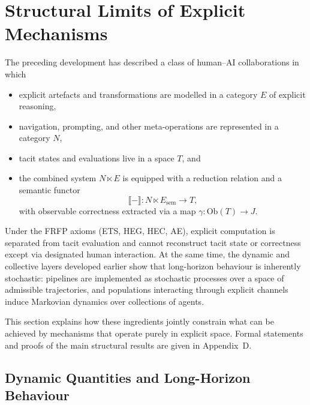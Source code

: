 \section{Structural Limits of Explicit Mechanisms}
\label{sec:structural-limits-explicit}

The preceding development has described a class of human--AI collaborations in which
\begin{itemize}
  \item explicit artefacts and transformations are modelled in a category $E$ of explicit reasoning,
  \item navigation, prompting, and other meta-operations are represented in a category $N$,
  \item tacit states and evaluations live in a space $T$, and
  \item the combined system $N \ltimes E$ is equipped with a reduction relation and a semantic functor
    \[
      \llbracket - \rrbracket : N \ltimes E_{\mathrm{sem}} \longrightarrow T,
    \]
    with observable correctness extracted via a map $\gamma : \mathrm{Ob}(T) \to J$.
\end{itemize}
Under the FRFP axioms (ETS, HEG, HEC, AE), explicit computation is separated from tacit evaluation and cannot reconstruct tacit state or correctness except via designated human interaction. At the same time, the dynamic and collective layers developed earlier show that long-horizon behaviour is inherently stochastic: pipelines are implemented as stochastic processes over a space of admissible trajectories, and populations interacting through explicit channels induce Markovian dynamics over collections of agents.

This section explains how these ingredients jointly constrain what can be achieved by mechanisms that operate purely in explicit space. Formal statements and proofs of the main structural results are given in Appendix~D.

\subsection{Dynamic Quantities and Long-Horizon Behaviour}

